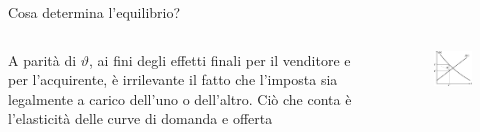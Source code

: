 \documentclass[11pt]{beamer}
\begin{document}
\begin{frame}{Cosa determina l'equilibrio?}
\begin{columns}
\begin{column}{.45\columnwidth}
A parità di $\vartheta$, ai fini degli effetti finali per il venditore e per
l'acquirente, è irrilevante il fatto che l'imposta sia legalmente a carico
dell'uno o dell'altro.  Ciò che conta è l'elasticità delle curve di domanda e
offerta
\end{column}

\begin{column}{.5\columnwidth}
\begin{figure}[htbp]
\centering
\includegraphics[width=\linewidth]{./figure/incidenza-4.pdf}
\end{figure}
\end{column}
\end{columns}
\end{frame}
\end{document}
